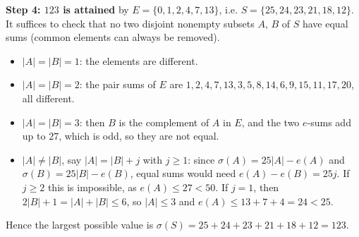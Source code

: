 \textbf{Step 4: $123$ is attained} by $E=\{0,1,2,4,7,13\}$, i.e. $S=\{25,24,23,21,18,12\}$. It suffices to check that no two disjoint nonempty subsets $A$, $B$ of $S$ have equal sums (common elements can always be removed).
\begin{itemize}
\item $|A|=|B|=1$: the elements are different.
\item $|A|=|B|=2$: the pair sums of $E$ are $1,2,4,7,13,3,5,8,14,6,9,15,11,17,20$, all different.
\item $|A|=|B|=3$: then $B$ is the complement of $A$ in $E$, and the two $e$-sums add up to $27$, which is odd, so they are not equal.
\item $|A|\ne|B|$, say $|A|=|B|+j$ with $j\ge1$: since $\sigma(A)=25|A|-e(A)$ and $\sigma(B)=25|B|-e(B)$, equal sums would need $e(A)-e(B)=25j$. If $j\ge2$ this is impossible, as $e(A)\le27<50$. If $j=1$, then $2|B|+1=|A|+|B|\le6$, so $|A|\le3$ and $e(A)\le13+7+4=24<25$.
\end{itemize}
Hence the largest possible value is $\sigma(S)=25+24+23+21+18+12=\boxed{123}$.
